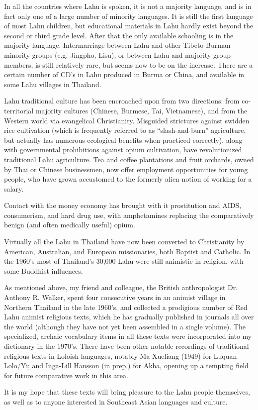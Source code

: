 In all the countries where Lahu is spoken, it is not a majority
language, and is in fact only one of a large number of minority
languages. It is still the first language of most Lahu children, but
educational materials in Lahu hardly exist beyond the second or third
grade level. After that the only available schooling is in the majority
language. Intermarriage between Lahu and other Tibeto-Burman minority
groups (e.g. Jingpho, Lisu), or between Lahu and majority-group members,
is still relatively rare, but seems now to be on the increase. There are
a certain number of CD's in Lahu produced in Burma or China, and
available in some Lahu villages in Thailand.

Lahu traditional culture has been encroached upon from two directions:
from co-territorial majority cultures (Chinese, Burmese, Tai,
Vietnamese), and from the Western world via evangelical Christianity.
Misguided strictures against swidden rice cultivation (which is
frequently referred to as ``slash-and-burn'' agriculture, but actually
has numerous ecological benefits when practiced correctly), along with
governmental prohibitions against opium cultivation, have revolutionized
traditional Lahu agriculture. Tea and coffee plantations and fruit
orchards, owned by Thai or Chinese businessmen, now offer employment
opportunities for young people, who have grown accustomed to the
formerly alien notion of working for a salary.

Contact with the money economy has brought with it prostitution and
AIDS, consumerism, and hard drug use, with amphetamines replacing the
comparatively benign (and often medically useful) opium.

Virtually all the Lahu in Thailand have now been converted to
Christianity by American, Australian, and European missionaries, both
Baptist and Catholic. In the 1960's most of Thailand's 30,000 Lahu were
still animistic in religion, with some Buddhist influences.

As mentioned above, my friend and colleague, the British anthropologist
Dr. Anthony R. Walker, spent four consecutive years in an animist
village in Northern Thailand in the late 1960's, and collected a
prodigious number of Red Lahu animist religious texts, which he has
gradually published in journals all over the world (although they have
not yet been assembled in a single volume). The specialized, archaic
vocabulary items in all these texts were incorporated into my dictionary
in the 1970's. There have been other notable recordings of traditional
religious texts in Loloish languages, notably Ma Xueliang (1949) for
Luquan Lolo/Yi; and Inga-Lill Hansson (in prep.) for Akha, opening up
a tempting field for future comparative work in this area.

It is my hope that these texts will bring pleasure to the Lahu people
themselves, as well as to anyone interested in Southeast Asian
languages and culture.



